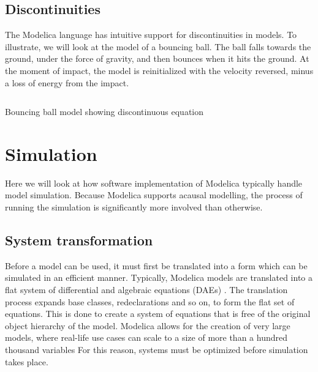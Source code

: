\documentclass[\rootfolder/main.tex]{subfiles}
\begin{document}
\subsection{Discontinuities}

The Modelica language has intuitive support for discontinuities in models.
To illustrate, we will look at the model of a bouncing ball\footnotemark.
The ball falls towards the ground, under the force of gravity, and then bounces when it hits the ground.
At the moment of impact, the model is reinitialized with the velocity reversed, minus a loss of energy from the impact.


\begin{listing}[ht]
    \inputminted[fontsize=\footnotesize]{Modelica}{\rootfolder/Models/MasterProject/Models/BouncingBall.mo}
    \caption{Bouncing ball model showing discontinuous equation}
\end{listing}

\section{Simulation}

Here we will look at how software implementation of Modelica typically handle model simulation.
Because Modelica supports acausal modelling, the process of running the simulation is significantly more involved than otherwise.

\subsection{System transformation}

Before a model can be used, it must first be translated into a form which can be simulated in an efficient manner.
Typically, Modelica models are translated into a flat system of differential and algebraic equations (DAEs) \cite{openmodelica.org:lundvall:sims:2005}.
The translation process expands base classes, redeclarations and so on, to form the flat set of equations.
This is done to create a system of equations that is free of the original object hierarchy of the model.
Modelica allows for the creation of very large models, where real-life use cases can scale to a size of more than a hundred thousand variables
For this reason, systems must be optimized before simulation takes place.
\end{document}
